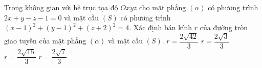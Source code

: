 \begin{ex}%
	Trong không gian với hệ trục tọa độ $Oxyz$ cho mặt phẳng $(\alpha)$ có phương trình $2 x+y-z-1=0$ và mặt cầu $(S)$ có phương trình $(x-1)^2+(y-1)^2+(z+2)^2=4$. Xác định bán kính $r$ của đường tròn giao tuyến của mặt phẳng $(\alpha)$ và mặt cầu $(S)$.
	\choice
	{$r=\dfrac{2 \sqrt{42}}{3}$}
	{\True $r=\dfrac{2 \sqrt 3}{3}$}
	{$r=\dfrac{2 \sqrt{15}}{3}$}
	{$r=\dfrac{2 \sqrt 7}{3}$}
\end{ex}
